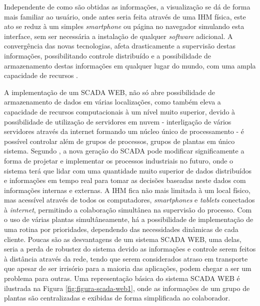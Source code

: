 \begin{figure}[!h]
{}	
\end{figure}

Independente de como são obtidas as informações, a visualização se dá de forma mais familiar ao usuário, onde antes seria feita através de uma \gls{IHM} física, este ato se reduz à um simples \textit{smartphone} ou página no navegador simulando esta interface, sem ser necessária a instalação de qualquer \textit{software} adicional. A convergência das novas tecnologias, afeta drasticamente a supervisão destas informações, possibilitando controle distribuído e a possibilidade de armazenamento destas informações em qualquer lugar do mundo, com uma ampla capacidade de recursos \cite{ScadaWebInterOp}.

A implementação de um \gls{SCADA} \gls{WEB}, não só abre possibilidade de armazenamento de dados em várias localizações, como também eleva a capacidade de recursos computacionais à um nível muito superior, devido à possibilidade de utilização de servidores em nuvem - interligação de vários servidores através da internet formando um núcleo único de processamento - é possível controlar além de grupos de processos, grupos de plantas em único sistema. Segundo \cite{ScadaNextGer}, a nova geração do \gls{SCADA} pode modificar significamente a forma de projetar e implementar os processos industriais no futuro, onde o sistema terá que lidar com uma quantidade muito superior de dados distribuídos e informações em tempo real para tomar as decisões baseadas neste dados com informações internas e externas. A \gls{IHM} fica não mais limitada à um local físico, mas acessível através de todos os computadores, \textit{smartphones} e \textit{tablets} conectados à \textit{internet}, permitindo a colaboração simultânea na supervisão do processo. Com o uso de várias plantas simultâneamente, há a possibilidade de implementação de uma rotina por prioridades, dependendo das necessidades dinâmicas de cada cliente.  Poucas são as desvantagens de um sistema \gls{SCADA} \gls{WEB}, uma delas, seria a perda de robustez do sistema devido as informações e controle serem feitos à distância através da rede, tendo que serem considerados atraso em transporte que apesar de ser irrisório para a maioria das aplicações, podem chegar a ser um problema para outras. Uma representação básica do sistema \gls{SCADA} \gls{WEB} é ilustrada na Figura \ref{fig:figura-scada-web1}, onde as informações de um grupo de plantas são centralizadas e exibidas de forma simplificada ao colaborador.

